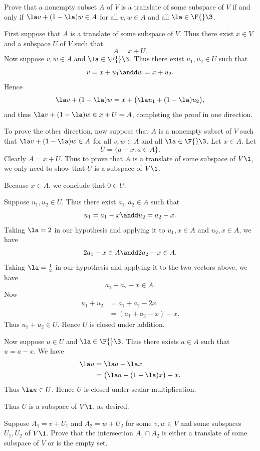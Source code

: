 \exercise
Prove that a nonempty subset $A$ of $V$ is a translate of some subspace of $V$ if and only if $\la v + (1-\la)w \in A$ for all $v, w \in A$ and all $\la \in \F{}\3$. \label{affine}

\begin{Solution}
First suppose that $A$ is a translate of some subspace of $V$. Thus there exist $x \in V$ and a subspace $U$ of $V$ such that
\[
A = x + U.
\]
Now suppose $v, w \in A$ and $\la \in \F{}\3$. Thus there exist $u_1, u_2 \in U$ such that
\[
v = x + u_1 \andd w = x + u_2.
\]
Hence
\[
\la v + (1-\la)w = x + \bigl(\la u_1 + (1-\la)u_2 \bigr),
\]
and thus $\la v + (1-\la)w \in x + U = A$, completing the proof in one direction.

To prove the other direction, now suppose that $A$ is a nonempty subset of $V$ such that $\la v + (1-\la)w \in A$ for all $v, w \in A$ and all $\la \in \F{}\3$. Let $x \in A$. Let
\[
U = \{a - x : a \in A\}.
\]
Clearly $A = x + U$. Thus to prove that $A$ is a translate of some subspace of $V\1$, we only need to show that $U$ is a subspace of $V\1$.

Because $x \in A$, we conclude that $0 \in U$.

Suppose $u_1, u_2 \in U$. Thus there exist $a_1, a_2 \in A$ such that
\[
u_1 = a_1 - x \andd u_2 = a_2 - x.
\]
Taking $\la = 2$ in our hypothesis and applying it to $u_1, x \in A$ and $u_2, x \in A$, we have
\[
2a_1 - x \in A \andd 2a_2 - x \in A.
\]
Taking $\la = \frac{1}{2}$ in our hypothesis and applying it to the two vectors above, we have
\[
a_1 + a_2 - x \in A.
\]
Now
\begin{align*}
u_1 + u_2 &= a_1 + a_2 - 2x \\
&= (a_1 + a_2 -x) - x.
\end{align*}
Thus $u_1 + u_2 \in U$. Hence $U$ is closed under addition.

Now suppose $u \in U$ and $\la \in \F{}\3$. Thus there exists $a \in A$ such that $u = a-x$. We have
\begin{align*}
\la u &= \la a - \la x \\
&= \bigl( \la a + (1 - \la) x \bigr) - x.
\end{align*}
Thus $\la u \in U$. Hence $U$ is closed under scalar multiplication.

Thus $U$ is a subspace of $V\1$, as desired.
\end{Solution}

\exercise
Suppose $A_1 = v + U_1$ and $A_2 = w + U_2$ for some $v, w \in V$ and some subspaces $U_1, U_2$ of $V\1$. Prove that the intersection $A_1 \cap A_2$ is either a translate of some subspace of $V$ or is the empty set.

